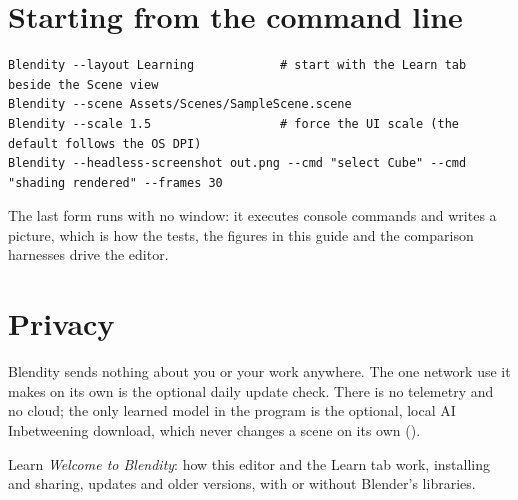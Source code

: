 \section{Starting from the command line}
\begin{lstlisting}[language=console]
Blendity --layout Learning            # start with the Learn tab beside the Scene view
Blendity --scene Assets/Scenes/SampleScene.scene
Blendity --scale 1.5                  # force the UI scale (the default follows the OS DPI)
Blendity --headless-screenshot out.png --cmd "select Cube" --cmd "shading rendered" --frames 30
\end{lstlisting}
The last form runs with no window: it executes console commands and writes a picture, which is how the tests, the
figures in this guide and the comparison harnesses drive the editor.

\section{Privacy}
Blendity sends nothing about you or your work anywhere. The one network use it makes on its own is the optional daily
update check. There is no telemetry and no cloud; the only learned model in the program is the optional, local AI
Inbetweening download, which never changes a scene on its own ().

\begin{fromnote}{Learn}
\emph{Welcome to Blendity}: how this editor and the Learn tab work, installing and sharing, updates and older versions,
with or without Blender's libraries.
\end{fromnote}
